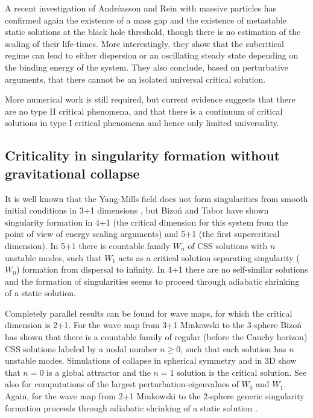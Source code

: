 \documentclass{article}
\begin{document}
A recent investigation of Andr\'easson and Rein \cite{AndreassonRein}
with massive particles has confirmed again the existence of a mass gap
and the existence of metastable static solutions at the black hole
threshold, though there is no estimation of the scaling of their
life-times. More interestingly, they show that the subcritical regime
can lead to either dispersion or an oscillating steady state depending
on the binding energy of the system. They also conclude, based on
perturbative arguments, that there cannot be an isolated universal
critical solution.

More numerical work is still required, but 
current evidence suggests that there are no type II critical
phenomena, and that there is a continuum of critical solutions in type
I critical phenomena and hence only limited universality.


\subsection{Criticality in singularity formation without 
gravitational collapse}

It is well known that the Yang-Mills field does not form singularities
from smooth initial conditions in 3+1 dimensions
\cite{EardleyMoncrief}, but Bizo\'n and Tabor \cite{BizonTabor} have
shown singularity formation in 4+1 (the critical dimension for this
system from the point of view of energy scaling arguments) and 5+1
(the first supercritical dimension). In 5+1 there is countable family
$W_n$ of CSS solutions with $n$ unstable modes, such that $W_1$ acts
as a critical solution separating singularity ($W_0$) formation from
dispersal to infinity.  In 4+1 there are no self-similar solutions and
the formation of singularities seems to proceed through adiabatic
shrinking of a static solution.

Completely parallel results can be found for wave maps, for which
the critical dimension is 2+1.
For the wave map from 3+1 Minkowski to the 3-sphere
Bizo\'n \cite{Bizon1} has shown that there is a countable family of
regular (before the Cauchy horizon) CSS solutions labeled by a nodal
number $n\ge 0$, such that each solution has $n$ unstable modes.
Simulations of collapse in spherical symmetry
\cite{BizonChmajTabor2,LieblingHirschmannIsenberg}
and in 3D \cite{Liebling3D} show that $n=0$ is a global
attractor and the $n=1$ solution is the critical solution. See also
\cite{DonningerAichelburg1,DonningerAichelburg2} for 
computations of the largest perturbation-eigenvalues of $W_0$ and $W_1$.
Again, for the wave map from
2+1 Minkowski to the 2-sphere generic singularity formation proceeds
through adiabatic shrinking of a static solution
\cite{BizonChmajTabor3}.
\end{document}
